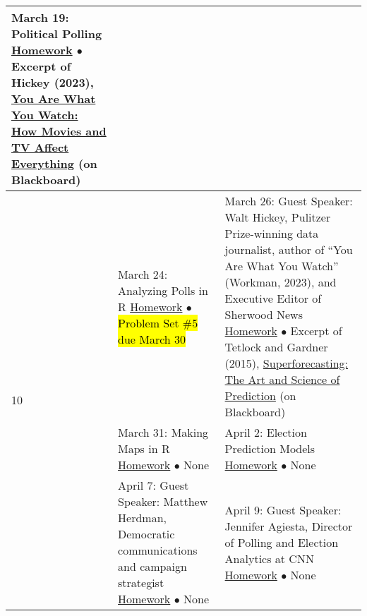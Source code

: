 \documentclass[12pt,letterpaper]{article}
\begin{document}
\begin{tabularx}{\textwidth}{|p{}|p{}||p{}|}
March 19: Political Polling \newline \newline
\ul{Homework} \newline
$\bullet$ Excerpt of Hickey (2023), \ul{You Are What You Watch: How Movies and TV Affect Everything} (on Blackboard) \\


\hline
\multirow{10}{*}{10} &

March 24: Analyzing Polls in R \newline \newline
\ul{Homework} \newline
$\bullet$ \hl{Problem Set \#5 due March 30} &

March 26: Guest Speaker: Walt Hickey, Pulitzer Prize-winning data journalist, author of ``You Are What You Watch'' (Workman, 2023), and Executive Editor of Sherwood News \newline \newline
\ul{Homework} \newline
$\bullet$ Excerpt of Tetlock and Gardner (2015), \ul{Superforecasting: The Art and Science of Prediction} (on Blackboard) \\


\hline
\multirow{4}{*}{11} &

March 31: Making Maps in R \newline \newline
\ul{Homework} \newline
$\bullet$ None  &

April 2: Election Prediction Models \newline \newline
\ul{Homework} \newline
$\bullet$ None \\


\hline
\multirow{6}{*}{12} &

April 7: Guest Speaker: Matthew Herdman, Democratic communications and campaign strategist \newline \newline
\ul{Homework} \newline
$\bullet$ None &

April 9: Guest Speaker: Jennifer Agiesta, Director of Polling and Election Analytics at CNN \newline \newline
\ul{Homework} \newline
$\bullet$ None \\


\end{tabularx}
\end{document}
